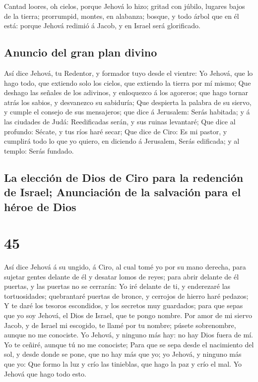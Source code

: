  Cantad loores, oh cielos, porque Jehová lo hizo; gritad
con júbilo, lugares bajos de la tierra; prorrumpid, montes, en alabanza;
bosque, y todo árbol que en él está: porque Jehová redimió á Jacob, y en
Israel será glorificado.

\hypertarget{anuncio-del-gran-plan-divino}{%
\subsection{Anuncio del gran plan
divino}\label{anuncio-del-gran-plan-divino}}

 Así dice Jehová, tu Redentor, y formador tuyo desde el
vientre: Yo Jehová, que lo hago todo, que extiendo solo los cielos, que
extiendo la tierra por mí mismo;  Que deshago las señales
de los adivinos, y enloquezco á los agoreros; que hago tornar atrás los
sabios, y desvanezco su sabiduría;  Que despierta la
palabra de su siervo, y cumple el consejo de sus mensajeros; que dice á
Jerusalem: Serás habitada; y á las ciudades de Judá: Reedificadas serán,
y sus ruinas levantaré;  Que dice al profundo: Sécate, y
tus ríos haré secar;  Que dice de Ciro: Es mi pastor, y
cumplirá todo lo que yo quiero, en diciendo á Jerusalem, Serás
edificada; y al templo: Serás fundado.

\hypertarget{la-elecciuxf3n-de-dios-de-ciro-para-la-redenciuxf3n-de-israel-anunciaciuxf3n-de-la-salvaciuxf3n-para-el-huxe9roe-de-dios}{%
\subsection{La elección de Dios de Ciro para la redención de Israel;
Anunciación de la salvación para el héroe de
Dios}\label{la-elecciuxf3n-de-dios-de-ciro-para-la-redenciuxf3n-de-israel-anunciaciuxf3n-de-la-salvaciuxf3n-para-el-huxe9roe-de-dios}}

\hypertarget{section-44}{%
\section{45}\label{section-44}}

 Así dice Jehová á su ungido, á Ciro, al cual tomé yo por su
mano derecha, para sujetar gentes delante de él y desatar lomos de
reyes; para abrir delante de él puertas, y las puertas no se cerrarán:
 Yo iré delante de ti, y enderezaré las tortuosidades;
quebrantaré puertas de bronce, y cerrojos de hierro haré pedazos;
 Y te daré los tesoros escondidos, y los secretos muy
guardados; para que sepas que yo soy Jehová, el Dios de Israel, que te
pongo nombre.  Por amor de mi siervo Jacob, y de Israel mi
escogido, te llamé por tu nombre; púsete sobrenombre, aunque no me
conociste.  Yo Jehová, y ninguno más hay: no hay Dios fuera
de mí. Yo te ceñiré, aunque tú no me conociste;  Para que se
sepa desde el nacimiento del sol, y desde donde se pone, que no hay más
que yo; yo Jehová, y ninguno más que yo:  Que formo la luz y
crío las tinieblas, que hago la paz y crío el mal. Yo Jehová que hago
todo esto.


